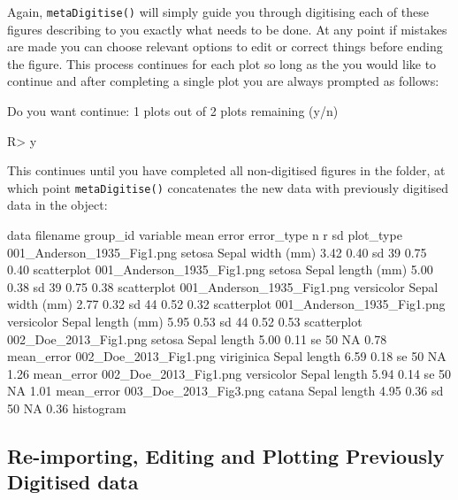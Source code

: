 \documentclass[12pt]{article}
\newcommand{\fct}[1]{\texttt{#1()}}
\begin{document}
Again, \fct{metaDigitise} will simply guide you through digitising each of these figures describing to you exactly what needs to be done. At any point if mistakes are made you can choose relevant options to edit or correct things before ending the figure. This process continues for each plot so long as the you would like to continue and after completing a single plot you are always prompted as follows:

\begin{CodeChunk}
\begin{CodeOutput}
Do you want continue: 1 plots out of 2 plots remaining (y/n)
\end{CodeOutput}
\begin{CodeInput}
R> y
\end{CodeInput}
\end{CodeChunk}

This continues until you have completed all non-digitised figures in the folder, at which point \fct{metaDigitise} concatenates the new data with previously digitised data in the object:

\begin{CodeChunk}
{\scriptsize
\begin{CodeOutput}
data
                  filename    group_id         variable   mean  error error_type n    r    sd   plot_type
001_Anderson_1935_Fig1.png      setosa  Sepal width (mm)  3.42  0.40  sd        39  0.75  0.40  scatterplot
001_Anderson_1935_Fig1.png      setosa  Sepal length (mm) 5.00  0.38  sd        39  0.75  0.38  scatterplot
001_Anderson_1935_Fig1.png  versicolor  Sepal width (mm)  2.77  0.32  sd        44  0.52  0.32  scatterplot
001_Anderson_1935_Fig1.png  versicolor  Sepal length (mm) 5.95  0.53  sd        44  0.52  0.53  scatterplot
     002_Doe_2013_Fig1.png      setosa  Sepal length      5.00  0.11  se        50  NA    0.78  mean_error
     002_Doe_2013_Fig1.png  viriginica  Sepal length      6.59  0.18  se        50  NA    1.26  mean_error
     002_Doe_2013_Fig1.png  versicolor  Sepal length      5.94  0.14  se        50  NA    1.01  mean_error
     003_Doe_2013_Fig3.png      catana  Sepal length      4.95  0.36  sd        50  NA    0.36  histogram
\end{CodeOutput}
}
\end{CodeChunk}


\subsection{Re-importing, Editing and Plotting Previously Digitised data}
\end{document}
